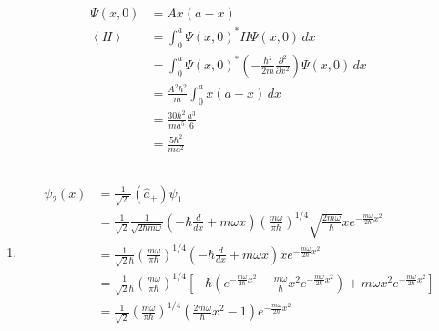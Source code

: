 \documentclass{article}
\newcommand{\ev}[1]{\left< #1 \right>}
\begin{document}
\subsection{}

\begin{align*}
  \Psi(x, 0) & = A x (a - x)                                                                                                \\
  \ev{H}     & = \int_0^a \Psi(x, 0)^* \hat{H} \Psi(x, 0) \,d x                                                             \\
             & = \int_0^a \Psi(x, 0)^* \left( -\frac{\hbar^2}{2 m} \frac{\partial^2}{\partial x^2} \right) \Psi(x, 0) \,d x \\
             & = \frac{A^2 \hbar^2}{m} \int_0^a x (a - x) \,d x                                                             \\
             & = \frac{30 \hbar^2}{m a^5} \frac{a^3}{6}                                                                     \\
             & = \frac{5 \hbar^2}{m a^2}
\end{align*}

\subsection{}

\begin{enumerate}
  \item

        \begin{align*}
          \psi_2(x) & = \frac{1}{\sqrt{2!}} (\hat{a}_+) \psi_1                                                                                                                                                                                                                            \\
                    & = \frac{1}{\sqrt{2}} \frac{1}{\sqrt{2 \hbar m \omega}} \left( -\hbar \frac{d}{d x} + m \omega x \right) \left( \frac{m \omega}{\pi \hbar} \right)^{1 / 4} \sqrt{\frac{2 m \omega}{\hbar}} x e^{-\frac{m \omega}{2 \hbar} x^2}                                       \\
                    & = \frac{1}{\sqrt{2} \hbar} \left( \frac{m \omega}{\pi \hbar} \right)^{1 / 4} \left( -\hbar \frac{d}{d x} + m \omega x \right) x e^{-\frac{m \omega}{2 \hbar} x^2}                                                                                                   \\
                    & = \frac{1}{\sqrt{2} \hbar} \left( \frac{m \omega}{\pi \hbar} \right)^{1 / 4} \left[ -\hbar \left( e^{-\frac{m \omega}{2 \hbar} x^2} - \frac{m \omega}{\hbar} x^2 e^{-\frac{m \omega}{2 \hbar} x^2} \right) + m \omega x^2 e^{-\frac{m \omega}{2 \hbar} x^2} \right] \\
                    & = \frac{1}{\sqrt{2}} \left( \frac{m \omega}{\pi \hbar} \right)^{1 / 4} \left( \frac{2 m \omega}{\hbar} x^2 - 1 \right) e^{-\frac{m \omega}{2 \hbar} x^2}
        \end{align*}
\end{enumerate}
\end{document}
